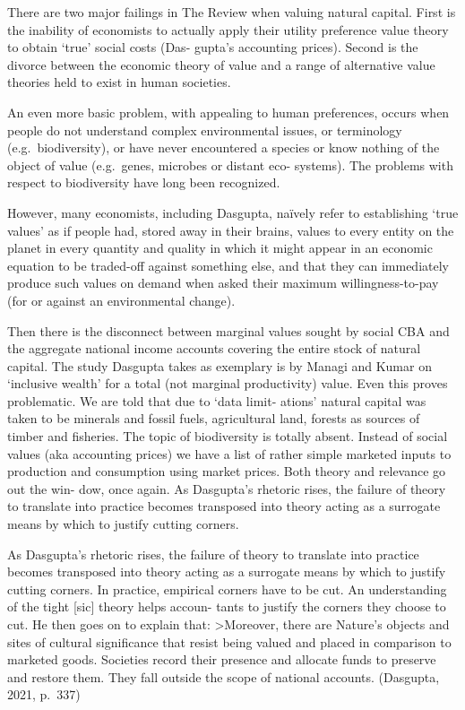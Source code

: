 \documentclass[
]{book}
\begin{document}
There are two major failings in The Review when valuing natural capital. First is the inability of
economists to actually apply their utility preference value theory to obtain `true' social costs (Das-
gupta's accounting prices). Second is the divorce between the economic theory of value and a range
of alternative value theories held to exist in human societies.

An even more basic problem, with appealing to human preferences, occurs when people do not
understand complex environmental issues, or terminology (e.g.~biodiversity), or have never
encountered a species or know nothing of the object of value (e.g.~genes, microbes or distant eco-
systems). The problems with respect to biodiversity have long been recognized.

However, many economists, including Dasgupta, naïvely refer to establishing `true values'
as if people had, stored away in their brains, values to every entity on the planet in every quantity
and quality in which it might appear in an economic equation to be traded-off against something
else, and that they can immediately produce such values on demand when asked their maximum
willingness-to-pay (for or against an environmental change).

Then there is the disconnect between marginal values sought by social CBA and the aggregate
national income accounts covering the entire stock of natural capital.
The study Dasgupta takes as exemplary is by Managi and Kumar on `inclusive wealth' for a total
(not marginal productivity) value. Even this proves problematic. We are told that due to `data limit-
ations' natural capital was taken to be minerals and fossil fuels, agricultural land, forests as sources
of timber and fisheries. The topic of biodiversity is totally absent. Instead of social values (aka
accounting prices) we have a list of rather simple marketed inputs to production and consumption
using market prices. Both theory and relevance go out the win-
dow, once again. As Dasgupta's rhetoric rises, the failure of theory to translate into practice
becomes transposed into theory acting as a surrogate means by which to justify cutting corners.

As Dasgupta's rhetoric rises, the failure of theory to translate into practice
becomes transposed into theory acting as a surrogate means by which to justify cutting corners.
In practice, empirical corners have to be cut. An understanding of the tight {[}sic{]} theory helps accoun-
tants to justify the corners they choose to cut.
He then goes on to explain that:
\textgreater Moreover, there are Nature's objects and sites of cultural significance that resist being valued and placed
in comparison to marketed goods. Societies record their presence and allocate funds to preserve and
restore them. They fall outside the scope of national accounts. (Dasgupta, 2021, p.~337)
\end{document}

